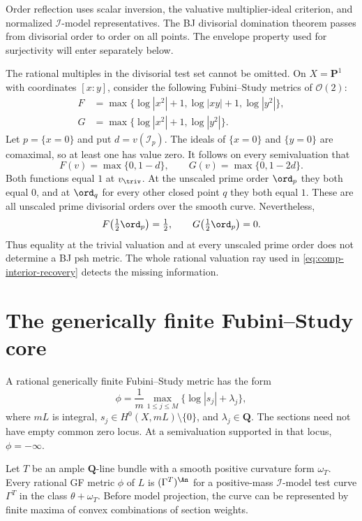 Order reflection uses scalar inversion, the valuative multiplier-ideal
criterion, and normalized $\mathcal I$-model representatives.
The BJ divisorial domination theorem passes from divisorial order
to order on all points. The envelope property used for surjectivity
will enter separately below.

\begin{example}
\label{ex:comp-rational-ray-test}
The rational multiples in the divisorial test set cannot be omitted.
On $X=\mathbf P^1$ with coordinates $[x:y]$, consider the following
Fubini--Study metrics of $\mathcal O(2)$:
\[
 \begin{split}
 F&=\max\{\log|x^2|+1,\log|xy|+1,\log|y^2|\},\\
 G&=\max\{\log|x^2|+1,\log|y^2|\}.
 \end{split}
\tag{57.7a}\label{eq:comp-prime-order-counterexample}
\]
Let $p=\{x=0\}$ and put $d=v(\mathcal I_p)$.
The ideals of $\{x=0\}$ and $\{y=0\}$ are comaximal, so
at least one has value zero. It follows on every semivaluation that
\[
                  F(v)=\max\{0,1-d\},\qquad
                  G(v)=\max\{0,1-2d\}.
\]
Both functions equal $1$ at $v_{\triv}$. At the unscaled prime
order $\ord_p$ they both equal $0$, and at $\ord_q$ for every
other closed point $q$ they both equal $1$.
These are all unscaled prime divisorial orders over the smooth
curve. Nevertheless,
\[
             F\bigl(\tfrac12\ord_p\bigr)=\tfrac12,
             \qquad G\bigl(\tfrac12\ord_p\bigr)=0.
\]
Thus equality at the trivial valuation and at every unscaled prime
order does not determine a BJ psh metric. The whole rational
valuation ray used in \eqref{eq:comp-interior-recovery} detects
the missing information.
\end{example}

\section{The generically finite Fubini--Study core}
\label{sec:comp-gf-core}

A rational generically finite Fubini--Study metric has the form
\[
 \phi=\frac1m\max_{1\leq j\leq M}
               \{\log|s_j|+\lambda_j\},
\tag{57.8}\label{eq:comp-gf}
\]
where $mL$ is integral,
$s_j\in H^0(X,mL)\setminus\{0\}$, and
$\lambda_j\in\mathbf Q$.
The sections need not have empty common zero locus.
At a semivaluation supported in that locus, $\phi=-\infty$.

\begin{lemma}\label{lem:comp-gf-realization}
Let $T$ be an ample $\mathbf Q$-line bundle with a smooth positive
curvature form $\omega_T$. Every rational GF metric $\phi$ of $L$
is $(\Gamma^T)^{\An}$ for a positive-mass
$\mathcal I$-model test curve $\Gamma^T$ in the class
$\theta+\omega_T$. Before model projection, the curve can be
represented by finite maxima of convex combinations of section weights.
\end{lemma}

